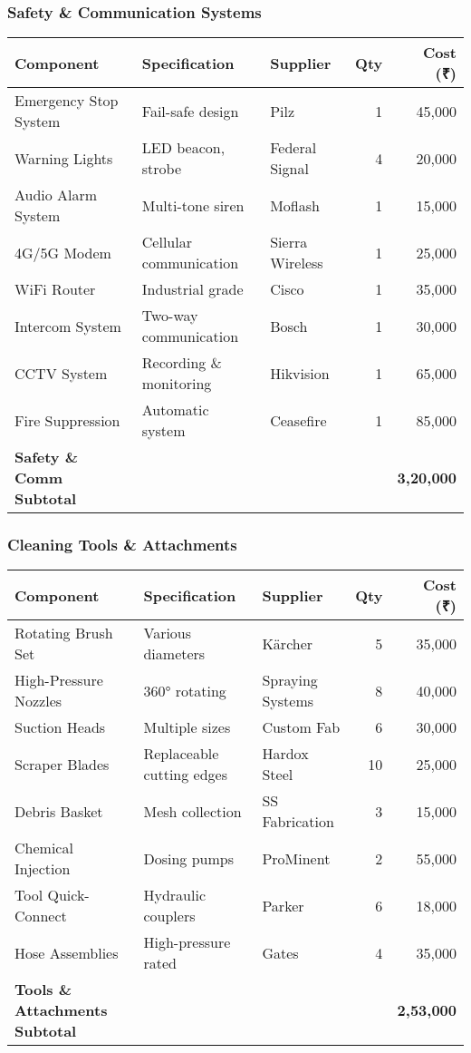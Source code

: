 \documentclass[11pt,a4paper]{article}
\begin{document}
\subsubsection{Safety \& Communication Systems}
\begin{center}
\small
\begin{tabular}{lllrr}
\toprule
\textbf{Component} & \textbf{Specification} & \textbf{Supplier} & \textbf{Qty} & \textbf{Cost (₹)} \\
\midrule
Emergency Stop System & Fail-safe design & Pilz & 1 & 45,000 \\
Warning Lights & LED beacon, strobe & Federal Signal & 4 & 20,000 \\
Audio Alarm System & Multi-tone siren & Moflash & 1 & 15,000 \\
4G/5G Modem & Cellular communication & Sierra Wireless & 1 & 25,000 \\
WiFi Router & Industrial grade & Cisco & 1 & 35,000 \\
Intercom System & Two-way communication & Bosch & 1 & 30,000 \\
CCTV System & Recording \& monitoring & Hikvision & 1 & 65,000 \\
Fire Suppression & Automatic system & Ceasefire & 1 & 85,000 \\
\midrule
\textbf{Safety \& Comm Subtotal} & & & & \textbf{3,20,000} \\
\bottomrule
\end{tabular}
\end{center}

\subsubsection{Cleaning Tools \& Attachments}
\begin{center}
\small
\begin{tabular}{lllrr}
\toprule
\textbf{Component} & \textbf{Specification} & \textbf{Supplier} & \textbf{Qty} & \textbf{Cost (₹)} \\
\midrule
Rotating Brush Set & Various diameters & Kärcher & 5 & 35,000 \\
High-Pressure Nozzles & 360° rotating & Spraying Systems & 8 & 40,000 \\
Suction Heads & Multiple sizes & Custom Fab & 6 & 30,000 \\
Scraper Blades & Replaceable cutting edges & Hardox Steel & 10 & 25,000 \\
Debris Basket & Mesh collection & SS Fabrication & 3 & 15,000 \\
Chemical Injection & Dosing pumps & ProMinent & 2 & 55,000 \\
Tool Quick-Connect & Hydraulic couplers & Parker & 6 & 18,000 \\
Hose Assemblies & High-pressure rated & Gates & 4 & 35,000 \\
\midrule
\textbf{Tools \& Attachments Subtotal} & & & & \textbf{2,53,000} \\
\bottomrule
\end{tabular}
\end{center}
\end{document}
